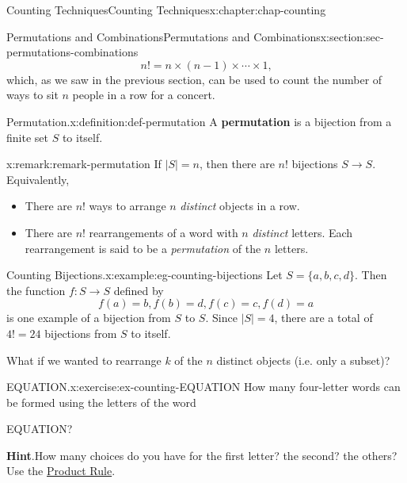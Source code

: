 \documentclass[oneside,10pt,]{book}
\newcommand{\blocktitlefont}{\relax}
\newcommand{\terminology}[1]{\textbf{#1}}
\numberwithin{equation}{section}
\begin{document}
\begin{chapterptx}{Counting Techniques}{}{Counting Techniques}{}{}{x:chapter:chap-counting}
\begin{sectionptx}{Permutations and Combinations}{}{Permutations and Combinations}{}{}{x:section:sec-permutations-combinations}
\begin{equation*}
n! = n \times (n-1) \times \cdots \times 1\text{,}
\end{equation*}
which, as we saw in the previous section, can be used to count the number of ways to sit \(n\) people in a row for a concert.%
\begin{definition}{Permutation.}{x:definition:def-permutation}%
A \terminology{permutation} is a bijection from a finite set \(S\) to itself.%
\end{definition}
\begin{remark}{}{x:remark:remark-permutation}%
If \(|S| = n\), then there are \(n!\) bijections \(S \rightarrow S\). Equivalently,%
\begin{itemize}[label=\textbullet]
\item{}There are \(n!\) ways to arrange \(n\) \emph{distinct} objects in a row.%
\item{}There are \(n!\) rearrangements of a word with \(n\) \emph{distinct} letters. Each rearrangement is said to be a \emph{permutation} of the \(n\) letters.%
\end{itemize}
%
\end{remark}
\begin{example}{Counting Bijections.}{x:example:eg-counting-bijections}%
Let \(S = \{a,b,c,d\}\). Then the function \(f: S \rightarrow S\) defined by%
\begin{equation*}
f(a) = b, f(b) = d, f(c) = c, f(d) = a
\end{equation*}
is one example of a bijection from \(S\) to \(S\). Since \(|S| = 4\), there are a total of \(4! = 24\) bijections from \(S\) to itself.%
\end{example}
What if we wanted to rearrange \(k\) of the \(n\) distinct objects (i.e. only a subset)?%
\begin{inlineexercise}{EQUATION.}{x:exercise:ex-counting-EQUATION}%
How many four-letter words can be formed using the letters of the word%
\begin{sidebyside}{1}{0.4}{0.4}{0}%
\begin{sbspanel}{0.2}%
EQUATION?%
\end{sbspanel}%
\end{sidebyside}%
\par\smallskip%
\noindent\textbf{\blocktitlefont Hint}.\hypertarget{g:hint:id324929}{}\quad{}How many choices do you have for the first letter? the second? the others? Use the \hyperref[x:principle:prin-prod-rule]{Product Rule}.%
\end{inlineexercise}

\end{sectionptx}
\end{chapterptx}
\end{document}
